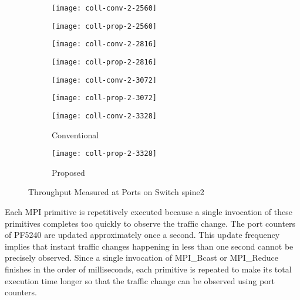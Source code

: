 \begin{figure}
    \begin{subfigure}{.48\linewidth}
        \texttt{[image: coll-conv-2-2560]}
    \end{subfigure}
    \hfill
    \begin{subfigure}{.48\linewidth}
        \texttt{[image: coll-prop-2-2560]}
    \end{subfigure}

    \begin{subfigure}{.48\linewidth}
        \texttt{[image: coll-conv-2-2816]}
    \end{subfigure}
    \hfill
    \begin{subfigure}{.48\linewidth}
        \texttt{[image: coll-prop-2-2816]}
    \end{subfigure}

    \begin{subfigure}{.48\linewidth}
        \texttt{[image: coll-conv-2-3072]}
    \end{subfigure}
    \hfill
    \begin{subfigure}{.48\linewidth}
        \texttt{[image: coll-prop-2-3072]}
    \end{subfigure}

    \begin{subfigure}{.48\linewidth}
        \texttt{[image: coll-conv-2-3328]}
        \caption{Conventional}%
        \label{fig:unisonflow-bw-spine2-conv}
    \end{subfigure}
    \hfill
    \begin{subfigure}{.48\linewidth}
        \texttt{[image: coll-prop-2-3328]}
        \caption{Proposed}%
        \label{fig:unisonflow-bw-spine2-prop}
    \end{subfigure}

    \caption{Throughput Measured at Ports on Switch spine2}%
    \label{fig:unisonflow-bw-spine2}
\end{figure}

Each MPI primitive is repetitively executed because a single invocation
of these primitives completes too quickly to observe the traffic change.
The port counters of PF5240 are updated approximately once a second.
This update frequency implies that instant traffic changes happening in less
than one second cannot be precisely observed. Since a single invocation of
MPI\_Bcast or MPI\_Reduce finishes in the order of milliseconds, each
primitive is repeated to make its total execution time longer so that the
traffic change can be observed using port counters.

